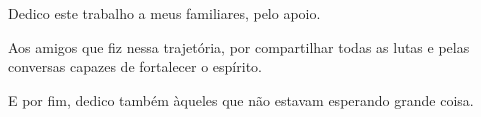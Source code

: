 \begin{dedicatoria}

Dedico este trabalho a meus familiares, pelo apoio.

Aos amigos que fiz nessa trajetória, por compartilhar 
todas as lutas e pelas conversas capazes de fortalecer o 
espírito. 

E por fim, dedico também àqueles que não estavam esperando 
grande coisa. 

\end{dedicatoria}
